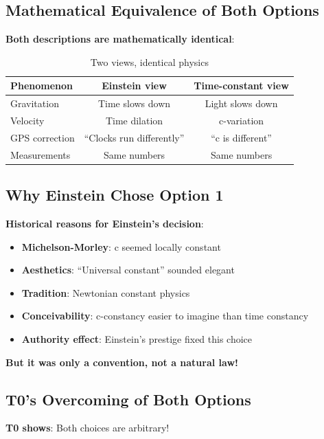 	\subsection{Mathematical Equivalence of Both Options}
	
	\textbf{Both descriptions are mathematically identical}:
	
	\begin{table}[htbp]
		\centering
		\begin{tabular}{|l|c|c|}
			\hline
			\textbf{Phenomenon} & \textbf{Einstein view} & \textbf{Time-constant view} \\
			\hline
			Gravitation & Time slows down & Light slows down \\
			Velocity & Time dilation & c-variation \\
			GPS correction & ``Clocks run differently'' & ``c is different'' \\
			Measurements & Same numbers & Same numbers \\
			\hline
		\end{tabular}
		\caption{Two views, identical physics}
	\end{table}
	
	\subsection{Why Einstein Chose Option 1}
	
	\textbf{Historical reasons for Einstein's decision}:
	\begin{itemize}
		\item \textbf{Michelson-Morley}: c seemed locally constant
		\item \textbf{Aesthetics}: ``Universal constant'' sounded elegant
		\item \textbf{Tradition}: Newtonian constant physics
		\item \textbf{Conceivability}: c-constancy easier to imagine than time constancy
		\item \textbf{Authority effect}: Einstein's prestige fixed this choice
	\end{itemize}
	
	\textbf{But it was only a convention, not a natural law!}
	
	\subsection{T0's Overcoming of Both Options}
	
	\textbf{T0 shows}: Both choices are arbitrary!
	
